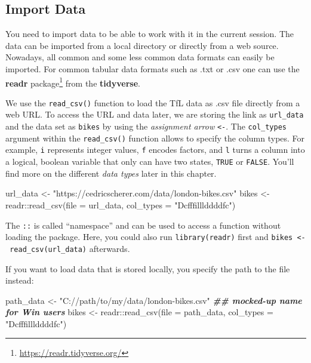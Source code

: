 \documentclass[
]{krantz}
\makeatletter
\newenvironment{Shaded}{\begin{snugshade}}{\end{snugshade}}
\newcommand{\AttributeTok}[1]{\textcolor[rgb]{0.61,0.61,0.61}{#1}}
\newcommand{\DocumentationTok}[1]{\textcolor[rgb]{0.37,0.37,0.37}{\textbf{\textit{#1}}}}
\newcommand{\FunctionTok}[1]{\textcolor[rgb]{0,0,0}{#1}}
\newcommand{\NormalTok}[1]{#1}
\newcommand{\OtherTok}[1]{\textcolor[rgb]{0.37,0.37,0.37}{#1}}
\newcommand{\SpecialCharTok}[1]{\textcolor[rgb]{0,0,0}{#1}}
\newcommand{\StringTok}[1]{\textcolor[rgb]{0.5,0.5,0.5}{#1}}
\renewcommand{\href}[2]{#2\footnote{\url{#1}}}
\newenvironment{kframe}{%
\medskip{}
\setlength{\fboxsep}{.8em}
 \def\at@end@of@kframe{}%
 \ifinner\ifhmode%
  \def\at@end@of@kframe{\end{minipage}}%
  \begin{minipage}{\columnwidth}%
 \fi\fi%
 \def\FrameCommand##1{\hskip\@totalleftmargin \hskip-\fboxsep
 \colorbox{shadecolor}{##1}\hskip-\fboxsep
     \hskip-\linewidth \hskip-\@totalleftmargin \hskip\columnwidth}%
 \MakeFramed {\advance\hsize-\width
   \@totalleftmargin\z@ \linewidth\hsize
   \@setminipage}}%
 {\par\unskip\endMakeFramed%
 \at@end@of@kframe}
\renewenvironment{Shaded}{\begin{kframe}}{\end{kframe}}
\makeatother
\begin{document}
\hypertarget{import}{%
\subsection{Import Data}\label{import}}

You need to import data to be able to work with it in the current session. The data can be imported from a local directory or directly from a web source. Nowadays, all common and some less common data formats can easily be imported. For common tabular data formats such as .txt or .csv one can use the \href{https://readr.tidyverse.org/}{\textbf{readr} package} \citep{readr} from the \textbf{tidyverse}.

We use the \texttt{read\_csv()} function to load the TfL data as .csv file directly from a web URL. To access the URL and data later, we are storing the link as \texttt{url\_data} and the data set as \texttt{bikes} by using the \emph{assignment arrow} \texttt{\textless{}-}. The \texttt{col\_types} argument within the \texttt{read\_csv()} function allows to specify the column types. For example, \texttt{i} represents integer values, \texttt{f} encodes factors, and \texttt{l} turns a column into a logical, boolean variable that only can have two states, \texttt{TRUE} or \texttt{FALSE}. You'll find more on the different \emph{data types} later in this chapter.

\begin{Shaded}
\begin{Highlighting}[]
\NormalTok{url\_data }\OtherTok{\textless{}{-}} \StringTok{"https://cedricscherer.com/data/london{-}bikes.csv"}
\NormalTok{bikes }\OtherTok{\textless{}{-}}\NormalTok{ readr}\SpecialCharTok{::}\FunctionTok{read\_csv}\NormalTok{(}\AttributeTok{file =}\NormalTok{ url\_data, }\AttributeTok{col\_types =} \StringTok{"Dcfffilllddddfc"}\NormalTok{)}
\end{Highlighting}
\end{Shaded}

The \texttt{::} is called ``namespace'' and can be used to access a function without loading the package. Here, you could also run \texttt{library(readr)} first and \texttt{bikes\ \textless{}-\ read\_csv(url\_data)} afterwards.

If you want to load data that is stored locally, you specify the path to the file instead:

\begin{Shaded}
\begin{Highlighting}[]
\NormalTok{path\_data }\OtherTok{\textless{}{-}} \StringTok{"C://path/to/my/data/london{-}bikes.csv"} \DocumentationTok{\#\# mocked{-}up name for Win users}
\NormalTok{bikes }\OtherTok{\textless{}{-}}\NormalTok{ readr}\SpecialCharTok{::}\FunctionTok{read\_csv}\NormalTok{(}\AttributeTok{file =}\NormalTok{ path\_data, }\AttributeTok{col\_types =} \StringTok{"Dcfffilllddddfc"}\NormalTok{)}
\end{Highlighting}
\end{Shaded}
\end{document}
